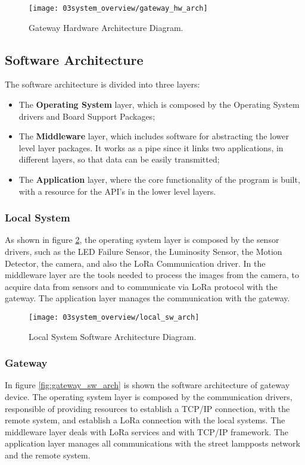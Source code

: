 \begin{figure}[H]
	\centering
	\texttt{[image: 03system\_overview/gateway\_hw\_arch]}
	\caption{Gateway Hardware Architecture Diagram.}
	\label{fig:gateway_hw_arch}
\end{figure}

\subsection{Software Architecture}
The software architecture is divided into three layers:
\begin{itemize}
        \item The \textbf{Operating System} layer, which is composed by the Operating System drivers and Board Support Packages;
        \item The \textbf{Middleware} layer, which includes software for abstracting the lower level layer packages. It works as a pipe since it links two applications, in different layers, so that data can be easily transmitted;
        \item The \textbf{Application} layer, where the core functionality of the program is built, with a resource for the API's in the lower level layers.
\end{itemize}

\subsubsection{Local System}

As shown in figure \ref{fig:local_sw_arch}, the operating system layer is composed by the sensor drivers, such as the LED Failure Sensor, the Luminosity Sensor, the Motion Detector, the camera, and also the LoRa Communication driver. In the middleware layer are the tools needed to process the images from the camera, to acquire data from sensors and to communicate via LoRa protocol with the gateway. The application layer manages the communication with the gateway.

\begin{figure}[H]
	\centering
	\texttt{[image: 03system\_overview/local\_sw\_arch]}
	\caption{Local System Software Architecture Diagram.}
	\label{fig:local_sw_arch}
\end{figure}

\subsubsection{Gateway}
In figure \ref{fig:gateway_sw_arch} is shown the software architecture of gateway device. The operating system layer is composed by the communication drivers, responsible of providing resources to establish a TCP/IP connection, with the remote system, and establish a LoRa connection with the local systems. The middleware layer deals with LoRa services and with TCP/IP framework. The application layer manages all communications with the street lampposts network and the remote system.

